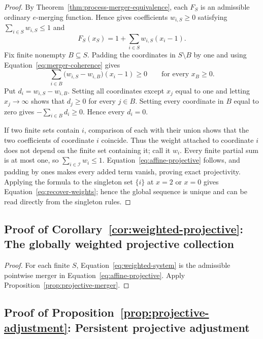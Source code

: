 \documentclass[11pt]{article}
\numberwithin{equation}{section}
\theoremstyle{plain}
\theoremstyle{definition}
\newcommand{\Iuniv}{\mathcal I}
\begin{document}
\begin{proof}
By Theorem~\ref{thm:process-merger-equivalence}, each $F_S$ is an admissible ordinary $e$-merging function. Hence \citet{Wang2025Merging} gives coefficients $w_{i,S}\geq0$ satisfying $\sum_{i\in S}w_{i,S}\leq1$ and
\[
  F_S(x_S)=1+\sum_{i\in S}w_{i,S}(x_i-1).
\]
Fix finite nonempty $B\subseteq S$. Padding the coordinates in $S\setminus B$ by one and using Equation~\eqref{eq:merger-coherence} gives
\begin{equation}\label{eq:weight-difference}
  \sum_{i\in B}\bigl(w_{i,S}-w_{i,B}\bigr)(x_i-1)\geq0
  \qquad\text{for every }x_B\geq0.
\end{equation}
Put $d_i=w_{i,S}-w_{i,B}$. Setting all coordinates except $x_j$ equal to one and letting $x_j\to\infty$ shows that $d_j\geq0$ for every $j\in B$. Setting every coordinate in $B$ equal to zero gives $-\sum_{i\in B}d_i\geq0$. Hence every $d_i=0$.

If two finite sets contain $i$, comparison of each with their union shows that the two coefficients of coordinate $i$ coincide. Thus the weight attached to coordinate $i$ does not depend on the finite set containing it; call it $w_i$. Every finite partial sum is at most one, so $\sum_{i\in\Iuniv}w_i\leq1$. Equation~\eqref{eq:affine-projective} follows, and padding by ones makes every added term vanish, proving exact projectivity. Applying the formula to the singleton set $\{i\}$ at $x=2$ or $x=0$ gives Equation~\eqref{eq:recover-weights}; hence the global sequence is unique and can be read directly from the singleton rules.
\end{proof}

\subsection{Proof of Corollary~\ref{cor:weighted-projective}: The globally weighted projective collection}\label{app:proof-weighted}

\begin{proof}
For each finite $S$, Equation~\eqref{eq:weighted-system} is the admissible pointwise merger in Equation~\eqref{eq:affine-projective}. Apply Proposition~\ref{prop:projective-merger}.
\end{proof}

\subsection{Proof of Proposition~\ref{prop:projective-adjustment}: Persistent projective adjustment}\label{app:proof-adjustment}
\end{document}
